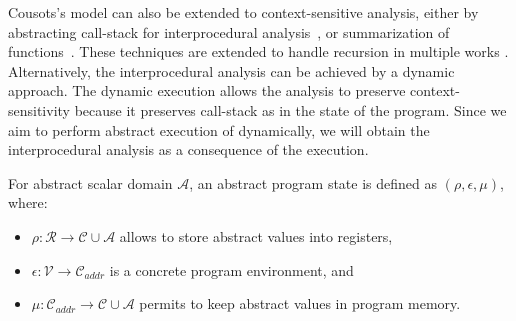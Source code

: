 Cousots's model can also be extended to context-sensitive analysis, either by
abstracting call-stack for interprocedural analysis~\cite{Jeannet2004,
Pascal2011}, or summarization of functions~\cite{Boutonnet2019}. These
techniques are extended to handle recursion in multiple works
\cite{Cousot1977Recursion, CousotCousot01}.  Alternatively, the interprocedural
analysis can be achieved by a dynamic approach. The dynamic execution allows
the analysis to preserve context-sensitivity because it preserves call-stack as
in the state of the program. Since we aim to perform abstract execution of
\llvm dynamically, we will obtain the interprocedural analysis as a consequence
of the execution.

\begin{definition}
    For abstract scalar domain $\mathcal{A}$, an abstract program state is
    defined as $(\rho, \epsilon, \mu)$, where:

    \begin{itemize}
        \itemsep0em
        \item $\rho \colon \mathcal{R} \to \mathcal{C} \cup \mathcal{A}$ allows to store abstract values into registers,
    \item $\epsilon \colon \mathcal{V} \to \mathcal{C}_{\textit{addr}}$ is a
        concrete program environment, and
    \item $\mu \colon \mathcal{C}_{\textit{addr}} \to \mathcal{C} \cup
        \mathcal{A}$ permits to keep abstract values in program memory.
    \end{itemize}
\end{definition}

